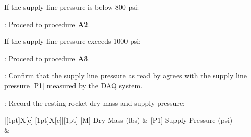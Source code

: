 \begin{checklist}
    \begin{checklist}[label=$\bullet$]
        \item If the supply line pressure is below 800 psi:
        \begin{checklist}
            \item \ops{}: Proceed to procedure \textbf{A2}.
        \end{checklist}
        \item If the supply line pressure exceeds 1000 psi:
        \begin{checklist}
            \item \ops{}: Proceed to procedure \textbf{A3}.
        \end{checklist}
    \end{checklist}
    \item \control: Confirm that the supply line pressure as read by \primary{} agrees with the supply line pressure [P1] measured by the DAQ system.
    \item \ops{}: Record the resting rocket dry mass and supply pressure:

    \begin{tabu} to \textwidth { |[1pt]X[c]|[1pt]X[c]|[1pt] }
    \tabucline[1pt]{}
    [M] Dry Mass (lbs) & [P1] Supply Pressure (psi) \\
    \tabucline[1pt]{}
    \vspace{1in} & \\
    \tabucline[1pt]{}
    \end{tabu}


\end{checklist}
